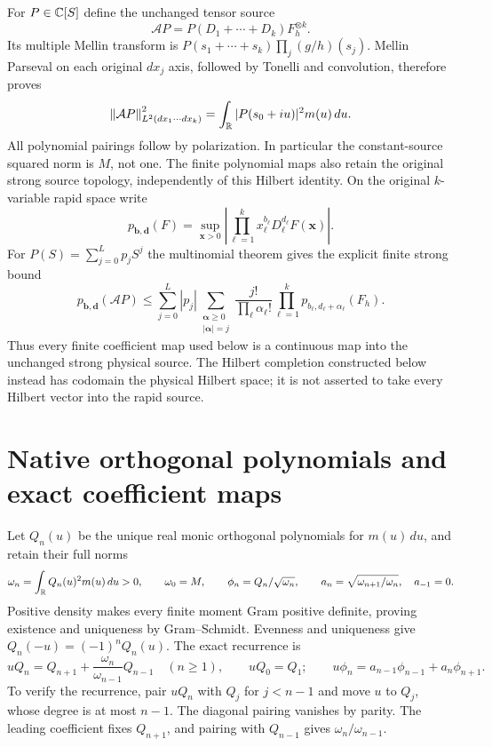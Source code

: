 For $P\in\mathbb C[S]$ define the unchanged tensor source
\begin{equation}\label{swlie:eq:physical}
 \mathcal A P=P(D_1+\cdots+D_k)F_h^{\otimes k}.
\end{equation}
Its multiple Mellin transform is
$P(s_1+\cdots+s_k)\prod_j(g/h)(s_j)$.
Mellin Parseval on each original $dx_j$ axis, followed by
Tonelli and convolution, therefore proves
\begin{equation}\label{swlie:eq:isometry}
 \left\lVert\mathcal A P\right\rVert_{L^2(dx_1\cdots dx_k)}^2
  =\int_\mathbb R|P(s_0+iu)|^2m(u)\,du.
\end{equation}
All polynomial pairings follow by polarization.
In particular the constant-source squared norm is $M$, not one.
The finite polynomial maps also retain the original strong
source topology, independently of this Hilbert identity.
On the original $k$-variable rapid space write
\[
 p_{\boldsymbol b,\boldsymbol d}(F)
 =\sup_{\boldsymbol x>0}
       \left|\prod_{\ell=1}^k x_\ell^{b_\ell}
                    D_\ell^{d_\ell}F(\boldsymbol x)\right|.
\]
For $P(S)=\sum_{j=0}^L p_jS^j$ the multinomial theorem gives
the explicit finite strong bound
\begin{equation}\label{swlie:eq:strongfinite}
 p_{\boldsymbol b,\boldsymbol d}(\mathcal A P)
 \leq\sum_{j=0}^L|p_j|
       \sum_{\substack{\boldsymbol\alpha\geq0\\|\boldsymbol\alpha|=j}}
       \frac{j!}{\prod_\ell\alpha_\ell!}
       \prod_{\ell=1}^k
                  p_{b_\ell,d_\ell+\alpha_\ell}(F_h).
\end{equation}
Thus every finite coefficient map used below is a continuous
map into the unchanged strong physical source.
The Hilbert completion constructed below instead has
codomain the physical Hilbert space; it is not asserted
to take every Hilbert vector into the rapid source.

\section{Native orthogonal polynomials and exact coefficient maps}

Let $Q_n(u)$ be the unique real monic orthogonal polynomials for
$m(u)\,du$, and retain their full norms
\begin{equation}\label{swlie:eq:norms}
 \omega_n=\int_\mathbb R Q_n(u)^2m(u)\,du>0,\qquad
 \omega_0=M,\qquad
 \phi_n=Q_n/\sqrt{\omega_n},\qquad
 a_n=\sqrt{\omega_{n+1}/\omega_n},\quad a_{-1}=0.
\end{equation}
Positive density makes every finite moment Gram positive
definite, proving existence and uniqueness by Gram--Schmidt.
Evenness and uniqueness give $Q_n(-u)=(-1)^nQ_n(u)$.
The exact recurrence is
\begin{equation}\label{swlie:eq:recurrence}
 uQ_n=Q_{n+1}+\frac{\omega_n}{\omega_{n-1}}Q_{n-1}
 \quad(n\geq1),\qquad uQ_0=Q_1;
 \qquad
 u\phi_n=a_{n-1}\phi_{n-1}+a_n\phi_{n+1}.
\end{equation}
To verify the recurrence, pair $uQ_n$ with $Q_j$ for $j<n-1$
and move $u$ to $Q_j$, whose degree is at most $n-1$.
The diagonal pairing vanishes by parity. The leading
coefficient fixes $Q_{n+1}$, and pairing with $Q_{n-1}$
gives $\omega_n/\omega_{n-1}$.

